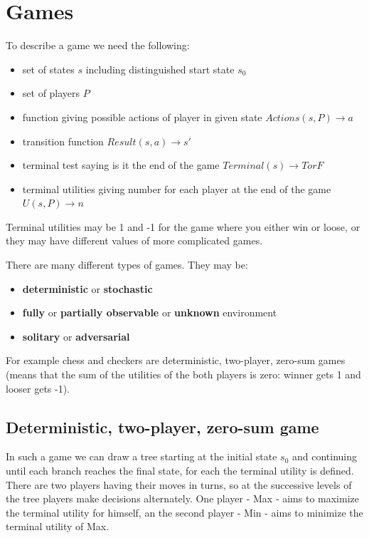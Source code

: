 \documentclass[a4paper,10pt]{article}
\begin{document}
\section{Games}
To describe a game we need the following:
\begin{itemize}
\setlength{\itemsep}{0pt}
\setlength{\parskip}{0pt}
\setlength{\parsep}{0pt}
\item set of states $s$ including distinguished  start state $s_0$
\item set of players $P$
\item function giving possible actions of player in given state $Actions(s,P) \rightarrow {a}$
\item transition function $Result(s,a) \rightarrow s'$
\item terminal test saying is it the end of the game $Terminal(s) \rightarrow T or F$
\item terminal utilities giving number for each player at the end of the game $U(s,P) \rightarrow n$
\end{itemize}
Terminal utilities may be 1 and -1 for the game where you either win or loose, or they may have different values of more complicated games.

There are many different types of games. They may be:\begin{itemize}
\setlength{\itemsep}{0pt}
\setlength{\parskip}{0pt}
\setlength{\parsep}{0pt}
\item \textbf{deterministic} or \textbf{stochastic}
\item \textbf{fully} or \textbf{partially observable} or \textbf{unknown} environment
\item \textbf{solitary} or \textbf{adversarial}
\end{itemize}

For example chess and checkers are deterministic, two-player, zero-sum games (means that the sum of the utilities of the both players is zero: winner gets 1 and looser gets -1).

\subsection{Deterministic, two-player, zero-sum game}

In such a game we can draw a tree starting at the initial state $s_0$ and continuing until each branch reaches the final state, for each the terminal utility is defined. There are two players having their moves in turns, so at the successive levels of the tree players make decisions alternately. One player - Max - aims to maximize the terminal utility for himself, an the second player - Min - aims to minimize the terminal utility of Max.
\end{document}
